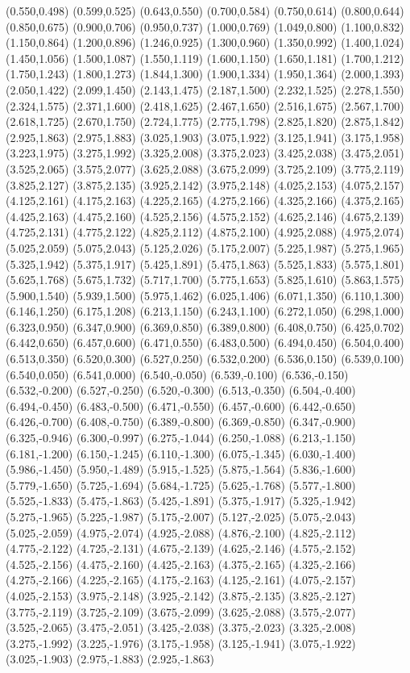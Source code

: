 (0.550,0.498) (0.599,0.525) (0.643,0.550) (0.700,0.584) (0.750,0.614) (0.800,0.644) (0.850,0.675) (0.900,0.706) (0.950,0.737) (1.000,0.769) (1.049,0.800) (1.100,0.832) (1.150,0.864) (1.200,0.896) (1.246,0.925) (1.300,0.960) (1.350,0.992) (1.400,1.024) (1.450,1.056) (1.500,1.087) (1.550,1.119) (1.600,1.150) (1.650,1.181) (1.700,1.212) (1.750,1.243) (1.800,1.273) (1.844,1.300) (1.900,1.334) (1.950,1.364) (2.000,1.393) (2.050,1.422) (2.099,1.450) (2.143,1.475) (2.187,1.500) (2.232,1.525) (2.278,1.550) (2.324,1.575) (2.371,1.600) (2.418,1.625) (2.467,1.650) (2.516,1.675) (2.567,1.700) (2.618,1.725) (2.670,1.750) (2.724,1.775) (2.775,1.798) (2.825,1.820) (2.875,1.842) (2.925,1.863) (2.975,1.883) (3.025,1.903) (3.075,1.922) (3.125,1.941) (3.175,1.958) (3.223,1.975) (3.275,1.992) (3.325,2.008) (3.375,2.023) (3.425,2.038) (3.475,2.051) (3.525,2.065) (3.575,2.077) (3.625,2.088) (3.675,2.099) (3.725,2.109) (3.775,2.119) (3.825,2.127) (3.875,2.135) (3.925,2.142) (3.975,2.148) (4.025,2.153) (4.075,2.157) (4.125,2.161) (4.175,2.163) (4.225,2.165) (4.275,2.166) (4.325,2.166) (4.375,2.165) (4.425,2.163) (4.475,2.160) (4.525,2.156) (4.575,2.152) (4.625,2.146) (4.675,2.139) (4.725,2.131) (4.775,2.122) (4.825,2.112) (4.875,2.100) (4.925,2.088) (4.975,2.074) (5.025,2.059) (5.075,2.043) (5.125,2.026) (5.175,2.007) (5.225,1.987) (5.275,1.965) (5.325,1.942) (5.375,1.917) (5.425,1.891) (5.475,1.863) (5.525,1.833) (5.575,1.801) (5.625,1.768) (5.675,1.732) (5.717,1.700) (5.775,1.653) (5.825,1.610) (5.863,1.575) (5.900,1.540) (5.939,1.500) (5.975,1.462) (6.025,1.406) (6.071,1.350) (6.110,1.300) (6.146,1.250) (6.175,1.208) (6.213,1.150) (6.243,1.100) (6.272,1.050) (6.298,1.000) (6.323,0.950) (6.347,0.900) (6.369,0.850) (6.389,0.800) (6.408,0.750) (6.425,0.702) (6.442,0.650) (6.457,0.600) (6.471,0.550) (6.483,0.500) (6.494,0.450) (6.504,0.400) (6.513,0.350) (6.520,0.300) (6.527,0.250) (6.532,0.200) (6.536,0.150) (6.539,0.100) (6.540,0.050) (6.541,0.000) (6.540,-0.050) (6.539,-0.100) (6.536,-0.150) (6.532,-0.200) (6.527,-0.250) (6.520,-0.300) (6.513,-0.350) (6.504,-0.400) (6.494,-0.450) (6.483,-0.500) (6.471,-0.550) (6.457,-0.600) (6.442,-0.650) (6.426,-0.700) (6.408,-0.750) (6.389,-0.800) (6.369,-0.850) (6.347,-0.900) (6.325,-0.946) (6.300,-0.997) (6.275,-1.044) (6.250,-1.088) (6.213,-1.150) (6.181,-1.200) (6.150,-1.245) (6.110,-1.300) (6.075,-1.345) (6.030,-1.400) (5.986,-1.450) (5.950,-1.489) (5.915,-1.525) (5.875,-1.564) (5.836,-1.600) (5.779,-1.650) (5.725,-1.694) (5.684,-1.725) (5.625,-1.768) (5.577,-1.800) (5.525,-1.833) (5.475,-1.863) (5.425,-1.891) (5.375,-1.917) (5.325,-1.942) (5.275,-1.965) (5.225,-1.987) (5.175,-2.007) (5.127,-2.025) (5.075,-2.043) (5.025,-2.059) (4.975,-2.074) (4.925,-2.088) (4.876,-2.100) (4.825,-2.112) (4.775,-2.122) (4.725,-2.131) (4.675,-2.139) (4.625,-2.146) (4.575,-2.152) (4.525,-2.156) (4.475,-2.160) (4.425,-2.163) (4.375,-2.165) (4.325,-2.166) (4.275,-2.166) (4.225,-2.165) (4.175,-2.163) (4.125,-2.161) (4.075,-2.157) (4.025,-2.153) (3.975,-2.148) (3.925,-2.142) (3.875,-2.135) (3.825,-2.127) (3.775,-2.119) (3.725,-2.109) (3.675,-2.099) (3.625,-2.088) (3.575,-2.077) (3.525,-2.065) (3.475,-2.051) (3.425,-2.038) (3.375,-2.023) (3.325,-2.008) (3.275,-1.992) (3.225,-1.976) (3.175,-1.958) (3.125,-1.941) (3.075,-1.922) (3.025,-1.903) (2.975,-1.883) (2.925,-1.863) 